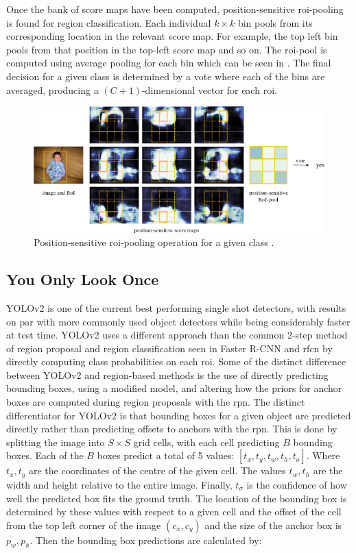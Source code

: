 Once the bank of score maps have been computed, position-sensitive \gls{roi}-pooling is found for region classification. Each individual $k \times k$ bin pools from its corresponding location in the relevant score map. For example, the top left bin pools from that position in the top-left score map and so on. The \gls{roi}-pool is computed using average pooling for each bin which can be seen in . The final decision for a given class is determined by a vote where each of the bins are averaged, producing a $(C+1)$-dimensional vector for each \gls{roi}.

\begin{figure}[H]
  \centering
    \includegraphics[width=1.0\textwidth]{Figs/Techanal/rfcnpooling.png}
      \caption{Position-sensitive \gls{roi}-pooling operation for a given class \cite{rfcn}.}
    \label{fig:rfcnpooling}
\end{figure}

\subsection{You Only Look Once}
YOLOv2 \cite{yolov2} is one of the current best performing single shot detectors, with results on par with more commonly used object detectors while being considerably faster at test time. YOLOv2 uses a different approach than the common 2-step method of region proposal and region classification seen in Faster R-CNN and \gls{rfcn} by directly computing class probabilities on each \gls{roi}. Some of the distinct difference between YOLOv2 and region-based methods is the use of directly predicting bounding boxes, using a modified model, and altering how the priors for anchor boxes are computed during region proposals with the \gls{rpn}. The distinct differentiator for YOLOv2 is that bounding boxes for a given object are predicted directly rather than predicting offsets to anchors with the \gls{rpn}. This is done by splitting the image into $S \times S$ grid cells, with each cell predicting $B$ bounding boxes. Each of the $B$ boxes predict a total of 5 values: $[t_x, t_y, t_w, t_h, t_o]$. Where $t_x, t_y$ are the coordinates of the centre of the given cell. The values $t_w, t_h$ are the width and height relative to the entire image. Finally, $t_\sigma$ is the confidence of how well the predicted box fits the ground truth. The location of the bounding box is determined by these values with respect to a given cell and the offset of the cell from the top left corner of the image $(c_x, c_y)$ and the size of the anchor box is $p_w, p_h$. Then the bounding box predictions are calculated by:

